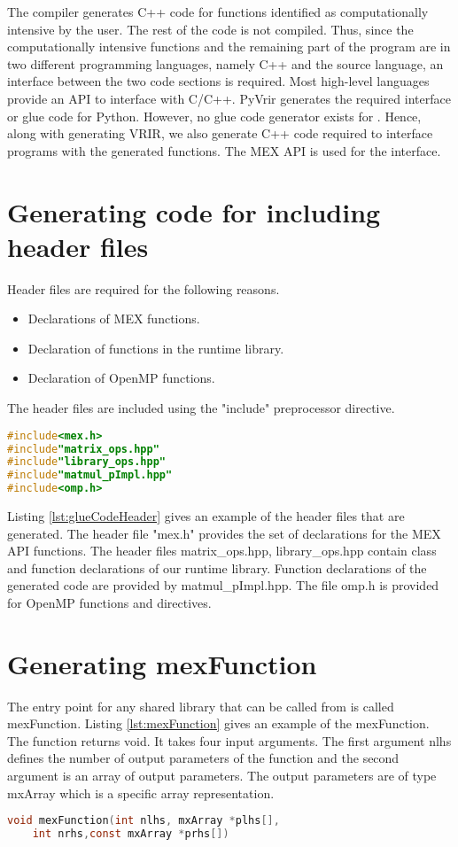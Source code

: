 The \velocty compiler generates C++ code for functions identified as computationally intensive by the user. The rest of the code is not compiled. Thus, since the computationally intensive functions and the remaining part of the program are in two different programming languages, namely C++ and the source language, an interface between the two code sections is required. Most high-level languages provide an API to interface with C/C++. PyVrir generates the required interface or glue code for Python. However, no glue code generator exists for \matlab.  Hence, along with generating VRIR, we also generate C++ code required to interface \matlab programs with the generated functions. The \matlab MEX API is used for the interface. 
\section{Generating code for including header files}
Header files are required for the following reasons.
\begin{itemize}
\item Declarations of MEX functions. 
\item Declaration of functions in the runtime library. 
\item Declaration of OpenMP functions.
\end{itemize}
The header files are included using the "include" preprocessor directive. 
\begin{lstlisting}[float,language=c,caption={Example of header files in glue code},label={lst:glueCodeHeader}]
#include<mex.h>
#include"matrix_ops.hpp"
#include"library_ops.hpp"
#include"matmul_pImpl.hpp"
#include<omp.h>
\end{lstlisting}
Listing \ref{lst:glueCodeHeader} gives an example of the header files that are generated. The header file "mex.h" provides the set of declarations for the MEX API functions. The header files matrix\_ops.hpp, library\_ops.hpp contain class and function declarations of our runtime library. Function declarations of the generated code are provided by matmul\_pImpl.hpp. The file omp.h is provided for OpenMP functions and directives. 
\section{Generating mexFunction}
The entry point for any shared library that can be called from \matlab is called mexFunction. Listing \ref{lst:mexFunction} gives an example of the mexFunction. The function returns void. It takes four input arguments. The first argument nlhs defines the number of output parameters of the function and the second argument is an array of output parameters. The output parameters are of type mxArray which is a \matlab specific array representation. 
\begin{lstlisting}[language=c,caption={The entry point function for the MEX API},label={lst:mexFunction}]
void mexFunction(int nlhs, mxArray *plhs[],
    int nrhs,const mxArray *prhs[])
\end{lstlisting}
